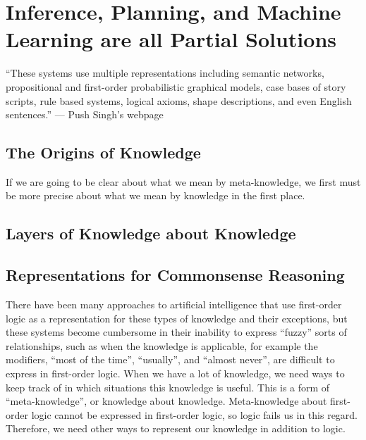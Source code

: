 \section{Inference, Planning, and Machine Learning are all Partial Solutions}

``These systems use multiple representations including semantic
networks, propositional and first-order probabilistic graphical
models, case bases of story scripts, rule based systems, logical
axioms, shape descriptions, and even English sentences.'' --- Push
Singh's webpage



\subsection{The Origins of Knowledge}

If we are going to be clear about what we mean by meta-knowledge, we
first must be more precise about what we mean by knowledge in the
first place.


\subsection{Layers of Knowledge about Knowledge}


\subsection{Representations for Commonsense Reasoning}

There have been many approaches to artificial intelligence that use
first-order logic as a representation for these types of knowledge and
their exceptions, but these systems become cumbersome in their
inability to express ``fuzzy'' sorts of relationships, such as when
the knowledge is applicable, for example the modifiers, ``most of the
time'', ``usually'', and ``almost never'', are difficult to express in
first-order logic.  When we have a lot of knowledge, we need ways to
keep track of in which situations this knowledge is useful.  This is a
form of ``meta-knowledge'', or knowledge about knowledge.
Meta-knowledge about first-order logic cannot be expressed in
first-order logic, so logic fails us in this regard.  Therefore, we
need other ways to represent our knowledge in addition to logic.


